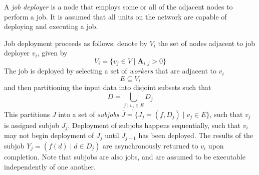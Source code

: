 \documentclass[../mthe-493-project-proposal.tex]{subfiles}
\begin{document}
    A \textit{job deployer} is a node that employs some or all of the adjacent nodes to perform a job. It is assumed that all units on the network are capable of deploying and executing a job.

    Job deployment proceeds as follows: denote by $V_i$ the set of nodes adjacent to job deployer $v_i$, given by
    \begin{equation}
    \label{eq:adjacent-nodes}
        V_i = \{v_j \in V \mid \mathbf{A}_{i,j} > 0\}
    \end{equation}
    The job is deployed by selecting a set of \textit{workers} that are adjacent to $v_i$
    \begin{equation}
    \label{eq:workers}
        E \subseteq V_i
    \end{equation}
    and then partitioning the input data into disjoint subsets such that
    \begin{equation}
    \label{eq:subjob-partition}
        D = \bigcup\limits_{j \mid v_j \in E} D_j
    \end{equation}
    This partitions $J$ into a set of \textit{subjobs} $\overline{J} = \{J_j = (f, D_j) \mid v_j \in E\}$, such that $v_j$ is assigned subjob $J_j$. Deployment of subjobs happens sequentially, such that $v_i$ may not begin deployment of $J_j$ until $J_{j-1}$ has been deployed. The results of the subjob $Y_j = (f(d) \mid d \in D_j)$ are asynchronously returned to $v_i$ upon completion. Note that subjobs are also jobs, and are assumed to be executable independently of one another.
\end{document}
